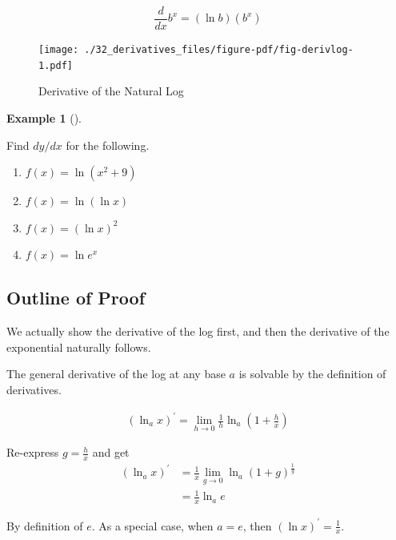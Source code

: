 \documentclass[
  letterpaper,
]{book}
\providecommand{\tightlist}{%
  \setlength{\itemsep}{0pt}\setlength{\parskip}{0pt}}\usepackage{longtable,booktabs,array}
\theoremstyle{definition}
\theoremstyle{definition}
\newtheorem{example}{Example}[chapter]
\theoremstyle{plain}
\theoremstyle{definition}
\theoremstyle{plain}
\theoremstyle{plain}
\theoremstyle{remark}
\begin{document}
\[\frac{d}{dx} b^x = (\ln b)\left(b^x\right)\]

\begin{figure}

{\centering \texttt{[image: ./32\_derivatives\_files/figure-pdf/fig-derivlog-1.pdf]}

}

\caption{\label{fig-derivlog}Derivative of the Natural Log}

\end{figure}

\leavevmode{}%
\begin{example}[]\label{exm-exmderivlog}

Find \(dy/dx\) for the following.

\begin{enumerate}
\def\labelenumi{\arabic{enumi}.}
\tightlist
\item
  \(f(x)=\ln(x^2+9)\)
\item
  \(f(x)=\ln(\ln x)\)
\item
  \(f(x)=(\ln x)^2\)
\item
  \(f(x)=\ln e^x\)
\end{enumerate}

\end{example}

\hypertarget{outline-of-proof}{%
\subsection*{Outline of Proof}\label{outline-of-proof}}

We actually show the derivative of the log first, and then the
derivative of the exponential naturally follows.

The general derivative of the log at any base \(a\) is solvable by the
definition of derivatives.

\begin{align*}
(\ln_a x)^\prime = \lim\limits_{h\to 0} \frac{1}{h}\ln_{a}\left(1 + \frac{h}{x}\right)
\end{align*}

Re-express \(g = \frac{h}{x}\) and get \begin{align*}
(\ln_a x)^\prime &= \frac{1}{x}\lim_{g\to 0}\ln_{a} (1 + g)^{\frac{1}{g}}\\
&= \frac{1}{x}\ln_a e
\end{align*}

By definition of \(e\). As a special case, when \(a = e\), then
\((\ln x)^\prime = \frac{1}{x}\).
\end{document}
